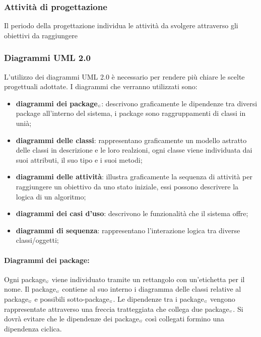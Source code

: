 \subsubsection{Attività di progettazione}\label{ProcessiPrimariProgettazioneAttivita}
Il periodo della progettazione individua le attività da svolgere attraverso gli obiettivi da raggiungere

\subsubsection{Diagrammi UML 2.0}\label{ProcessiPrimariProgettazioneUML}
L'utilizzo dei diagrammi UML 2.0 è necessario per rendere più chiare le scelte progettuali adottate. I diagrammi che verranno utilizzati sono:
\begin{itemize}
	\item \textbf{diagrammi dei package$_{\scaleto{G}{3pt}}$}: descrivono graficamente le dipendenze tra diversi package all'interno del sistema, i package sono raggruppamenti di classi in unià;
	\item \textbf{diagrammi delle classi}: rappresentano graficamente un modello astratto delle classi in descrizione e le loro realzioni, ogni classe viene individuata dai suoi attributi, il suo tipo e i suoi metodi;
	\item \textbf{diagrammi delle attività}: illustra graficamente la sequenza di attività per raggiungere un obiettivo da uno stato iniziale, essi possono descrivere la logica di un algoritmo; %
	\item \textbf{diagrammi dei casi d'uso}: descrivono le funzionalità che il sistema offre;
	\item \textbf{diagrammi di sequenza}: rappresentano l'interazione logica tra diverse classi/oggetti;
\end{itemize}

\paragraph{Diagrammi dei package:}  \label{ProcessiPrimariProgettazioneUMLDiagrammiDeiPackage}
Ogni package$_{\scaleto{G}{3pt}}$ viene individuato tramite un rettangolo con un'etichetta per il nome. Il package$_{\scaleto{G}{3pt}}$ contiene al suo interno i diagramma delle classi relative al package$_{\scaleto{G}{3pt}}$ e possibili sotto-package$_{\scaleto{G}{3pt}}$. Le dipendenze tra i package$_{\scaleto{G}{3pt}}$ vengono rappresentate attraverso una freccia tratteggiata che collega due package$_{\scaleto{G}{3pt}}$. Si dovrà evitare che le dipendenze dei package$_{\scaleto{G}{3pt}}$ così collegati formino una dipendenza ciclica.

